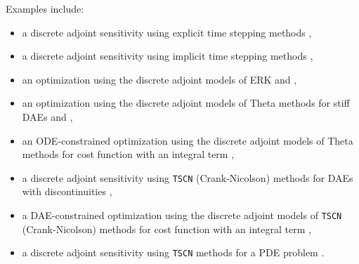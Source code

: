 Examples
include:
\begin{itemize}
\item a discrete adjoint sensitivity using explicit time stepping
  methods \href{https://www.mcs.anl.gov/petsc/petsc-current/src/ts/tutorials/ex16adj.c.html}{},
\item a discrete adjoint sensitivity using implicit time stepping
  methods \href{https://www.mcs.anl.gov/petsc/petsc-current/src/ts/tutorials/ex20adj.c.html}{},
\item an optimization using the discrete adjoint models of ERK
  \href{https://www.mcs.anl.gov/petsc/petsc-current/src/ts/tutorials/ex16opt_ic.c.html}{} and \href{https://www.mcs.anl.gov/petsc/petsc-current/src/ts/tutorials/ex16opt_p.c.html}{},
\item an optimization using the discrete adjoint models of Theta
methods for stiff DAEs
    \href{https://www.mcs.anl.gov/petsc/petsc-current/src/ts/tutorials/ex20opt_ic.c.html}{} and \href{https://www.mcs.anl.gov/petsc/petsc-current/src/ts/tutorials/ex20opt_p.c.html}{},
\item an ODE-constrained optimization using the discrete adjoint
  models of Theta methods for cost function with an integral term \href{https://www.mcs.anl.gov/petsc/petsc-current/src/ts/tutorials/power_grid/ex3opt.c.html}{},
\item a discrete adjoint sensitivity using \lstinline{TSCN} (Crank-Nicolson)
  methods for DAEs with discontinuities \href{https://www.mcs.anl.gov/petsc/petsc-current/src/ts/tutorials/power_grid/stability/stability_9bus/ex9busadj.c.html}{},
\item a DAE-constrained optimization using the discrete adjoint
models of \lstinline{TSCN} (Crank-Nicolson) methods for cost function with an
    integral term \href{https://www.mcs.anl.gov/petsc/petsc-current/src/ts/tutorials/power_grid/stability/stability_9bus/ex9busopt.c.html}{},
  \item a discrete adjoint sensitivity using \lstinline{TSCN} methods for a
  PDE problem \href{https://www.mcs.anl.gov/petsc/petsc-current/src/ts/tutorials/advection-diffusion-reaction/ex5adj.c.html}{}.
\end{itemize}

